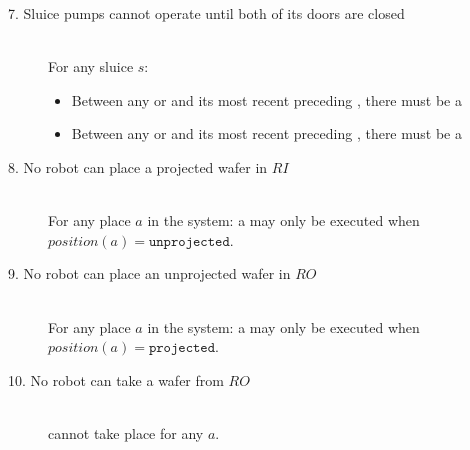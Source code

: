 \begin{description}
\begin{itemize}
 \end{itemize}

 \item[7. Sluice pumps cannot operate until both of its doors are closed] \hfill \\
 For any sluice $s$:
 \begin{itemize}
  \item Between any  or  and its most recent preceding , there must be a 
  \item Between any  or  and its most recent preceding , there must be a 
 \end{itemize}

\item[8. No robot can place a projected wafer in $RI$] \hfill \\
For any place $a$ in the system: a  may only be executed when $position(a) = \texttt{unprojected}$.

\item[9. No robot can place an unprojected wafer in $RO$] \hfill \\
For any place $a$ in the system: a  may only be executed when $position(a) = \texttt{projected}$.

\item[10. No robot can take a wafer from $RO$] \hfill \\
 cannot take place for any $a$.
 
\end{description}
